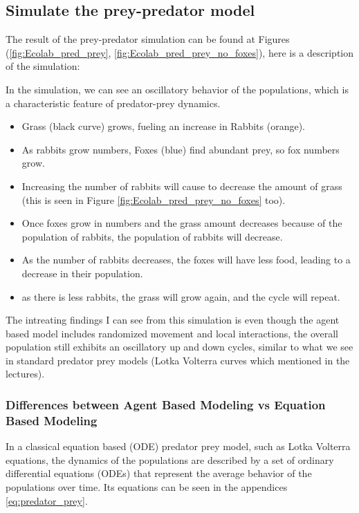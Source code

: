 \subsection{Simulate the prey-predator model}

The result of the prey-predator simulation can be found at Figures (\ref{fig:Ecolab_pred_prey}, \ref{fig:Ecolab_pred_prey_no_foxes}), here is a description of the simulation:

In the simulation, we can see an oscillatory behavior of the populations, which is a characteristic feature of predator-prey dynamics.
\begin{itemize}
    \item Grass (black curve) grows, fueling an increase in Rabbits (orange).
    \item As rabbits grow numbers, Foxes (blue) find abundant prey, so fox numbers grow.
    \item Increasing the number of rabbits will cause to decrease the amount of grass (this is seen in Figure \ref{fig:Ecolab_pred_prey_no_foxes} too).
    \item Once foxes grow in numbers and the grass amount decreases because of the population of rabbits, the population of rabbits will decrease.
    \item As the number of rabbits decreases, the foxes will have less food, leading to a decrease in their population.
    \item as there is less rabbits, the grass will grow again, and the cycle will repeat.
\end{itemize}

The intreating findings I can see from this simulation is even though the agent based model includes randomized movement and local interactions, the overall population still exhibits an oscillatory up and down cycles, similar to what we see in standard predator prey models (Lotka Volterra curves which mentioned in the lectures).


\subsubsection{Differences between Agent Based Modeling vs Equation Based Modeling}

In a classical equation based (ODE) predator prey model, such as Lotka Volterra equations, the dynamics of the populations are described by a set of ordinary differential equations (ODEs) that represent the average behavior of the populations over time. Its equations can be seen in the appendices \ref{eq:predator_prey}.

